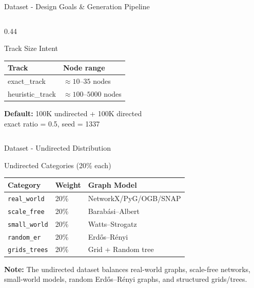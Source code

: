 \documentclass[aspectratio=169]{beamer}
\renewcommand{\footnotesize}{\tiny}
\begin{document}
\begin{frame}{Dataset - Design Goals \& Generation Pipeline}
\begin{columns}[T]
\begin{column}{0.44\textwidth}
\begin{block}{Track Size Intent}
				\begin{tabular}{ll}
					\toprule
					Track            & Node range                  \\
					\midrule
					exact\_track     & $\approx 10$--$35$ nodes    \\
					heuristic\_track & $\approx 100$--$5000$ nodes \\
					\bottomrule
				\end{tabular}
			\end{block}
			\vspace{4pt}
			\begin{tcolorbox}[greenbox,fontupper=\footnotesize]
				\textbf{Default:} 100K undirected + 100K directed\\
				exact ratio = 0.5, seed = 1337
			\end{tcolorbox}
		\end{column}
	\end{columns}
\end{frame}

\begin{frame}{Dataset - Undirected Distribution}
	\small
	\begin{block}{Undirected Categories (20\% each)}
		\begin{tabular}{lll}
			\toprule
			Category              & Weight & Graph Model                         \\
			\midrule
			\texttt{real\_world}  & 20\%   & NetworkX/PyG/OGB/SNAP               \\
			\texttt{scale\_free}  & 20\%   & Barabási–Albert \cite{barabasi1999} \\
			\texttt{small\_world} & 20\%   & Watts–Strogatz \cite{watts1998}     \\
			\texttt{random\_er}   & 20\%   & Erdős–Rényi \cite{erdos1959}        \\
			\texttt{grids\_trees} & 20\%   & Grid + Random tree                  \\
			\bottomrule
		\end{tabular}
	\end{block}
	\vspace{0.3cm}
	\begin{tcolorbox}[greenbox,fontupper=\footnotesize]
		\textbf{Note:} The undirected dataset balances real-world graphs,
		scale-free networks, small-world models, random Erdős–Rényi graphs,
		and structured grids/trees.
	\end{tcolorbox}
\end{frame}
\end{document}
